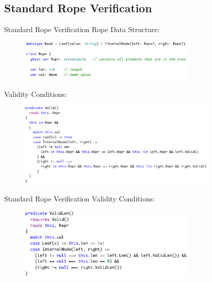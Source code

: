 \documentclass{beamer}
\begin{document}
\subsection{Standard Rope Verification}

\begin{frame}{Standard Rope Verification}
  Rope Data Structure:

  \begin{figure}
      \includegraphics[width=8.5cm]{images/rope-datastructure.png}
  \end{figure}

  Validity Conditions:

  \begin{figure}
      \includegraphics[width=9.5cm]{images/rope-valid.png}
  \end{figure}

\end{frame}

\begin{frame}{Standard Rope Verification}
  Validity Conditions:

  \begin{figure}
      \includegraphics[width=8.5cm]{images/rope-valid-len.png}
  \end{figure}

\end{frame}
\end{document}
